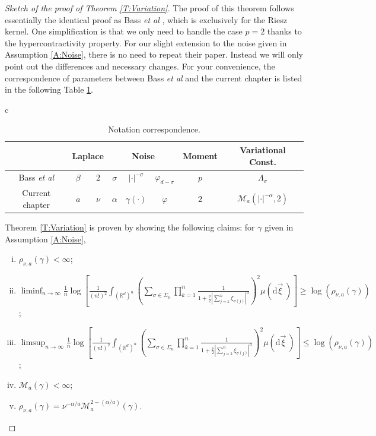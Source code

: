 \documentclass[12pt]{report}
\theoremstyle{plain}
\theoremstyle{definition}
\numberwithin{equation}{section}
\newcommand{\R}{\mathbb{R}}
\newcommand{\ud}{\ensuremath{ \mathrm{d} }}
\begin{document}
\begin{proof}[Sketch of the proof of Theorem \ref{T:Variation}]
	The proof of this theorem follows essentially the identical proof as Bass {\it et al}
	\cite{bass.chen.ea:09:large}, which is exclusively for the Riesz kernel. One simplification is that we only need
	to handle the case $p=2$ thanks to the hypercontractivity property. For our slight extension to
	the noise given in Assumption \ref{A:Noise}, there is no need to repeat their paper. Instead we
	will only point out the differences and necessary changes. For your convenience, the
	correspondence of parameters between Bass {\it et al} \cite{bass.chen.ea:09:large} and the current chapter is listed
	in the following Table \ref{Tb:Notation}.
	
	\begin{table}[htpb]
		\centering
		\caption{Notation correspondence.}
		\label{Tb:Notation}
		\renewcommand{\arraystretch}{1.2}
		\begin{tabular}{c}
			\renewcommand{\arraystretch}{1.2}
			\begin{tabular}{|c|c|c|c|c|c|c|c|}
				\hline
				& \multicolumn{2}{c|}{Laplace} & \multicolumn{3}{c|}{Noise} & Moment   & Variational Const.  \\ \hline
				Bass {\it et al} \cite{bass.chen.ea:09:large} & $\beta$                      & $2$                        & $\sigma$ & $|\cdot|^{-\sigma}$  & $\varphi_{d-\sigma}$ & $p$ & $\Lambda_\sigma$                                \\
				Current chapter                 & $a$                          & $\nu$                      & $\alpha$ & $\gamma(\cdot)$      & $\varphi$            & $2$ & $\mathcal{M}_a\left(|\cdot|^{-\alpha},2\right)$ \\ \hline
			\end{tabular}
		\end{tabular}
	\end{table}
	
	
	Theorem  \ref{T:Variation} is proven by showing the following claims: for $\gamma$ given in
	Assumption  \ref{A:Noise},
	\begin{enumerate}[(i)]
		\item $\rho_{\nu,a}(\gamma)<\infty$;
		\item $\liminf_{n \to \infty} \frac{1}{n} \log \left[ \frac{1}{(n!)^2} \int_{(\R^d)^n} \left( \sum_{\sigma \in \Sigma_n} \prod_{k=1}^n \frac{1}{1+ \frac{\nu}{2}|\sum_{j=k}^n \xi_{\sigma(j)}|^a}\right)^2 \mu (\ud \vec{\xi}\:)\right] \ge \log\left( \rho_{\nu, a}\left(\gamma\right) \right)$;
		\item $\limsup_{n \to \infty} \frac{1}{n} \log \left[ \frac{1}{(n!)^2} \int_{(\R^d)^n} \left( \sum_{\sigma \in \Sigma_n} \prod_{k=1}^n \frac{1}{1+ \frac{\nu}{2}|\sum_{j=k}^n \xi_{\sigma(j)}|^a}\right)^2 \mu (\ud \vec{\xi}\:)\right] \le \log\left( \rho_{\nu, a}\left(\gamma\right) \right)$;
		\item $\mathcal{M}_{a}(\gamma)<\infty$;
		\item $\rho_{\nu,a}(\gamma) = \nu^{-\alpha/a} \mathcal{M}_a^{2-(\alpha / a)}(\gamma)$.
	\end{enumerate}
	

\end{proof}
\end{document}

